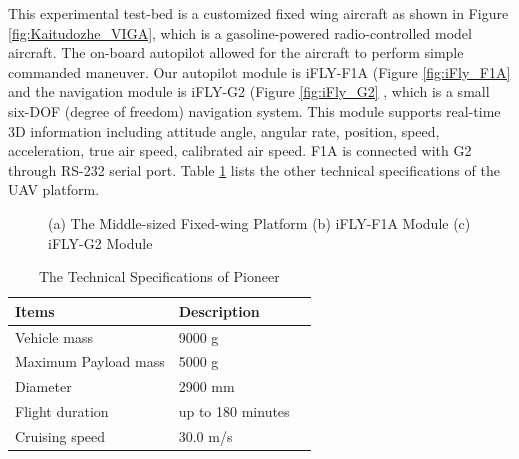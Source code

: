 \documentclass[journal,article,submit,moreauthors,pdftex,10pt,a4paper]{mdpi}
\begin{document}
This experimental test-bed is  a customized fixed wing aircraft as shown in Figure  \ref{fig:Kaitudozhe_VIGA}, which is a gasoline-powered radio-controlled model aircraft. The on-board autopilot allowed for the aircraft to perform simple commanded maneuver. Our autopilot module is iFLY-F1A (Figure  \ref{fig:iFly_F1A} and the navigation module is iFLY-G2 (Figure  \ref{fig:iFly_G2} \cite{IFLY}, which is a small six-DOF (degree of freedom) navigation system. This module supports real-time 3D information including attitude angle, angular rate, position, speed, acceleration, true air speed, calibrated air speed. F1A is connected with G2 through RS-232 serial port. Table \ref{tab:platform_specifications} lists the other technical specifications of the UAV platform.

\begin{figure}[!tb]
	\centering
	\caption{(a) The Middle-sized Fixed-wing Platform (b) iFLY-F1A Module   (c) iFLY-G2 Module}
\end{figure}



\begin{table}
	\caption{The Technical Specifications of Pioneer}
	\label{tab:platform_specifications}
	\begin{center}
		\renewcommand{\arraystretch}{1.1}
		\begin{tabular}{lll}
			\hline
			\textbf {Items}  & \textbf{Description} \\
			\hline
			Vehicle mass & 9000 g \\
			Maximum Payload mass & 5000 g \\
			Diameter & 2900 mm \\
			Flight duration & up to 180 minutes \\
			Cruising speed & 30.0 m/s \\
			\hline
		\end{tabular}
	\end{center}
\end{table}
\end{document}
